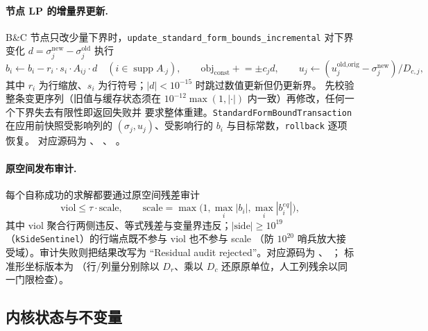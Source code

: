 \paragraph{节点 LP 的增量界更新.}
B\&C 节点只改少量下界时，\texttt{update\_standard\_form\_bounds\_incremental}
对下界变化 $d = \sigma_j^{\text{new}} - \sigma_j^{\text{old}}$ 执行
\begin{equation}
  b_i \leftarrow b_i - r_i \cdot s_i \cdot A_{ij} \cdot d
  \quad (i \in \operatorname{supp} A_{\cdot j}),\qquad
  \mathrm{obj}_{\text{const}} \mathrel{+}= \pm c_j d,\qquad
  u_j \leftarrow (u_j^{\text{old,orig}} - \sigma_j^{\text{new}})/D_{c,j},
\end{equation}
其中 $r_i$ 为行缩放、$s_i$ 为行符号；$|d| < 10^{-15}$ 时跳过数值更新但仍更新界。
先校验整条变更序列（旧值与缓存状态须在
$10^{-12}\max(1,|\cdot|)$ 内一致）再修改，任何一个下界失去有限性即返回失败并
要求整体重建。\texttt{StandardFormBoundTransaction} 在应用前快照受影响列的
$(\sigma_j, u_j)$、受影响行的 $b_i$ 与目标常数，\texttt{rollback} 逐项恢复。
对应源码为 、
、
。

\paragraph{原空间发布审计.}
每个自称成功的求解都要通过原空间残差审计
\begin{equation}
  \mathrm{viol} \le \tau \cdot \mathrm{scale},\qquad
  \mathrm{scale} = \max\bigl(1, \max_i |b_i|, \max_i |b^{eq}_i|\bigr),
\end{equation}
其中 viol 聚合行两侧违反、等式残差与变量界违反；$|\mathrm{side}| \ge 10^{19}$
（\texttt{kSideSentinel}）的行端点既不参与 viol 也不参与 scale
（防 $10^{20}$ 哨兵放大接受域）。审计失败则把结果改写为
``Residual audit rejected''。对应源码为
、
；
标准形坐标版本为 
（行/列量分别除以 $D_r$、乘以 $D_c$ 还原原单位，人工列残余以同一门限检查）。

\subsection{内核状态与不变量}
\label{subsec:engine-lp-state}

